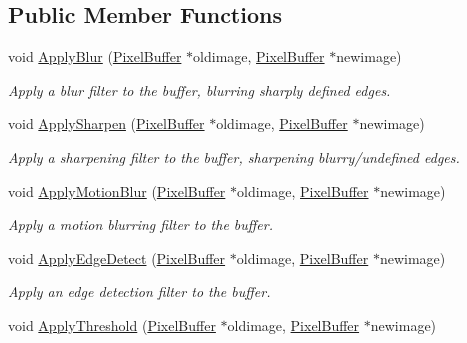 \subsection*{Public Member Functions}
\begin{DoxyCompactItemize}
\item 
void \hyperlink{classimage__tools_1_1FilterManager_a8978ca9e14203c0013651262793ead17}{Apply\+Blur} (\hyperlink{classimage__tools_1_1PixelBuffer}{Pixel\+Buffer} $\ast$oldimage, \hyperlink{classimage__tools_1_1PixelBuffer}{Pixel\+Buffer} $\ast$newimage)
\begin{DoxyCompactList}\small\item\em Apply a blur filter to the buffer, blurring sharply defined edges. \end{DoxyCompactList}\item 
void \hyperlink{classimage__tools_1_1FilterManager_a6fa9cea0e3d0bd01767fecae3bda5351}{Apply\+Sharpen} (\hyperlink{classimage__tools_1_1PixelBuffer}{Pixel\+Buffer} $\ast$oldimage, \hyperlink{classimage__tools_1_1PixelBuffer}{Pixel\+Buffer} $\ast$newimage)
\begin{DoxyCompactList}\small\item\em Apply a sharpening filter to the buffer, sharpening blurry/undefined edges. \end{DoxyCompactList}\item 
void \hyperlink{classimage__tools_1_1FilterManager_a9de2f9c0b952c7904e4688b71149caa7}{Apply\+Motion\+Blur} (\hyperlink{classimage__tools_1_1PixelBuffer}{Pixel\+Buffer} $\ast$oldimage, \hyperlink{classimage__tools_1_1PixelBuffer}{Pixel\+Buffer} $\ast$newimage)
\begin{DoxyCompactList}\small\item\em Apply a motion blurring filter to the buffer. \end{DoxyCompactList}\item 
void \hyperlink{classimage__tools_1_1FilterManager_ac7baa0fa177ca47dff742028d69364f6}{Apply\+Edge\+Detect} (\hyperlink{classimage__tools_1_1PixelBuffer}{Pixel\+Buffer} $\ast$oldimage, \hyperlink{classimage__tools_1_1PixelBuffer}{Pixel\+Buffer} $\ast$newimage)
\begin{DoxyCompactList}\small\item\em Apply an edge detection filter to the buffer. \end{DoxyCompactList}\item 
void \hyperlink{classimage__tools_1_1FilterManager_a8551f73f07d78796fede226954f9c00f}{Apply\+Threshold} (\hyperlink{classimage__tools_1_1PixelBuffer}{Pixel\+Buffer} $\ast$oldimage, \hyperlink{classimage__tools_1_1PixelBuffer}{Pixel\+Buffer} $\ast$newimage)

\end{DoxyCompactItemize}
